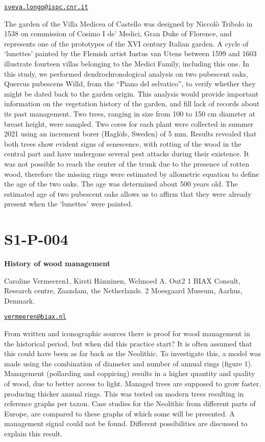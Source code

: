\documentclass[
]{book}
\begin{document}
\href{mailto:sveva.longo@ispc.cnr.it}{\nolinkurl{sveva.longo@ispc.cnr.it}}

The garden of the Villa Medicea of Castello was designed by Niccolò
Tribolo in 1538 on commission of Cosimo I de' Medici, Gran Duke of
Florence, and represents one of the prototypes of the XVI century
Italian garden. A cycle of `lunettes' painted by the Flemish artist
Iustus van Utens between 1599 and 1603 illustrate fourteen villas
belonging to the Medici Family, including this one. In this study, we
performed dendrochronological analysis on two pubescent oaks, Quercus
pubescens Willd, from the ``Piano del selvatico'', to verify whether they
might be dated back to the garden origin. This analysis would provide
important information on the vegetation history of the garden, and fill
lack of records about its past management. Two trees, ranging in size
from 100 to 150 cm diameter at breast height, were sampled. Two cores
for each plant were collected in summer 2021 using an increment borer
(Haglöfs, Sweden) of 5 mm. Results revealed that both trees show evident
signs of senescence, with rotting of the wood in the central part and
have undergone several pest attacks during their existence. It was not
possible to reach the center of the trunk due to the presence of rotten
wood, therefore the missing rings were estimated by allometric equation
to define the age of the two oaks. The age was determined about 500
years old. The estimated age of two pubescent oaks allows us to affirm
that they were already present when the `lunettes' were painted.

\hypertarget{s1-p-004}{%
\section*{S1-P-004}\label{s1-p-004}}

\textbf{History of wood management}

Caroline Vermeeren1, Kirsti Hänninen, Welmoed A. Out2 1 BIAX Consult,
Research centre, Zaandam, the Netherlands. 2 Moesgaard Museum, Aarhus,
Denmark.

\href{mailto:vermeeren@biax.nl}{\nolinkurl{vermeeren@biax.nl}}

From written and iconographic sources there is proof for wood management
in the historical period, but when did this practice start? It is often
assumed that this could have been as far back as the Neolithic. To
investigate this, a model was made using the combination of diameter and
number of annual rings (figure 1). Management (pollarding and coppicing)
results in a higher quantity and quality of wood, due to better access
to light. Managed trees are supposed to grow faster, producing thicker
annual rings. This was tested on modern trees resulting in reference
graphs per taxon. Case studies for the Neolithic from different parts of
Europe, are compared to these graphs of which some will be presented. A
management signal could not be found. Different possibilities are
discussed to explain this result.
\end{document}
